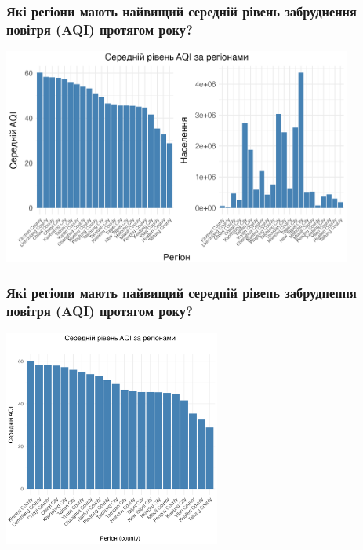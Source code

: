 \documentclass{beamer}
\begin{document}
\begin{frame}
  \frametitle{Які регіони мають найвищий середній рівень забруднення повітря (AQI) протягом року?}

  \begin{center}
    \includegraphics[height=2.8in]{plots/question4/avg_aqi_by_county_w_pop.png}
  \end{center}
\end{frame}

\begin{frame}
  \frametitle{Які регіони мають найвищий середній рівень забруднення повітря (AQI) протягом року?}

  \begin{center}
    \includegraphics[height=2.8in]{plots/question4/avg_aqi_by_county.png}
  \end{center}
\end{frame}
\end{document}

